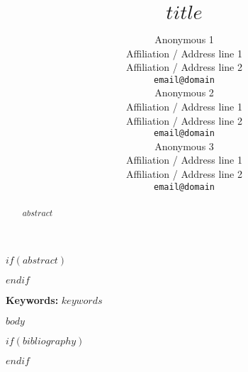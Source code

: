 \documentclass[10pt]{article}
\title{$title$}
\author{
  Anonymous 1 \\
  Affiliation / Address line 1 \\
  Affiliation / Address line 2 \\
  {\tt email@domain} \\\And
 Anonymous 2 \\
  Affiliation / Address line 1 \\
  Affiliation / Address line 2 \\
  {\tt email@domain} \\\And
  Anonymous 3 \\
  Affiliation / Address line 1 \\
  Affiliation / Address line 2 \\
  {\tt email@domain} \\}
\date{}
\begin{document}
\maketitle
$if(abstract)$
\begin{abstract}
$abstract$
\end{abstract}
$endif$

{\bf Keywords:} $keywords$

$body$


$if(bibliography)$

$endif$
% 
\end{document}
